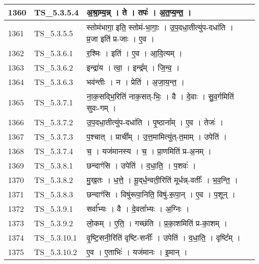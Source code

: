 \documentclass[17pt]{extarticle}
\begin{document}
\begin{longtable}{||p{0.4in}||p{0.9in}||p{4.0in}||p{0.9in}||}
        \hline
            1360 & TS\_5.3.5.4 & अ॒श्रा॒म्य॒न्न्   ।   ते   ।   तपः॑   ।   अ॒त॒प्य॒न्त॒   ।    &      \\
        \hline
            1361 & TS\_5.3.5.5 & स्तोम॑भागा॒ इति॒ स्तोम॑{-}भा॒गाः॒   ।   उ॒प॒दधा॒तीत्यु॑प{-}दधा॑ति   ।   प्र॒जा इति॑ प्र{-}जाः   ।   ए॒व   ।    &      \\
        \hline
            1362 & TS\_5.3.6.1 & र॒श्मिः   ।   इति॑   ।   ए॒व   ।   आ॒दि॒त्यम्   ।    &      \\
        \hline
            1363 & TS\_5.3.6.2 & इन्द्रा॑य   ।   त्वा॒   ।   इन्द्र᳚म्   ।   जि॒न्व॒   ।    &      \\
        \hline
            1364 & TS\_5.3.6.3 & भव॑न्तीः   ।   न   ।   प्रेति॑   ।   अ॒जा॒य॒न्त॒   ।    &      \\
        \hline
            1365 & TS\_5.3.7.1 & ना॒क॒सद्भि॒रिति॑ नाक॒सत्{-}भिः॒   ।   वै   ।   दे॒वाः   ।   सु॒व॒र्गमिति॑ सुवः{-}गम्   ।    &      \\
        \hline
            1366 & TS\_5.3.7.2 & उ॒प॒दधा॒तीत्यु॑प{-}दधा॑ति   ।   पृ॒ष्ठाना᳚म्   ।   ए॒व   ।   तेजः॑   ।    &      \\
        \hline
            1367 & TS\_5.3.7.3 & प॒श्चात्   ।   प्राची᳚म्   ।   उ॒त्त॒मामित्यु॑त्{-}त॒माम्   ।   उपेति॑   ।    &      \\
        \hline
            1368 & TS\_5.3.7.4 & च॒   ।   यज॑मानस्य   ।   च॒   ।   प्रा॒णमिति॑ प्र{-}अ॒नम्   ।    &      \\
        \hline
            1369 & TS\_5.3.8.1 & छन्दाꣳ॑सि   ।   उपेति॑   ।   द॒धा॒ति॒   ।   प॒शवः॑   ।    &      \\
        \hline
            1370 & TS\_5.3.8.2 & मु॒ख॒तः   ।   ध॒त्ते॒   ।   मू॒द्‌र्ध॒न्वती॒रिति॑ मूर्धन्न्{-}वतीः᳚   ।   भ॒व॒न्ति॒   ।    &      \\
        \hline
            1371 & TS\_5.3.8.3 & छन्दाꣳ॑सि   ।   विषु॑रूपा॒निति॒ विषु॑{-}रू॒पा॒न्   ।   ए॒व   ।   प॒शून्   ।    &      \\
        \hline
            1372 & TS\_5.3.9.1 & सर्वा᳚भ्यः   ।   वै   ।   दे॒वता᳚भ्यः   ।   अ॒ग्निः   ।    &      \\
        \hline
            1373 & TS\_5.3.9.2 & लो॒कम्   ।   ए॒ति॒   ।   गच्छ॑ति   ।   प्र॒का॒शमिति॑ प्र{-}का॒शम्   ।    &      \\
        \hline
            1374 & TS\_5.3.10.1 & वृ॒ष्टि॒सनी॒रिति॑ वृष्टि{-}सनीः᳚   ।   उपेति॑   ।   द॒धा॒ति॒   ।   वृष्टि᳚म्   ।    &      \\
        \hline
            1375 & TS\_5.3.10.2 & ए॒व   ।   ए॒ताभिः॑   ।   यज॑मानः   ।   इ॒मान्   ।    &      \\

\end{longtable}
\end{document}
